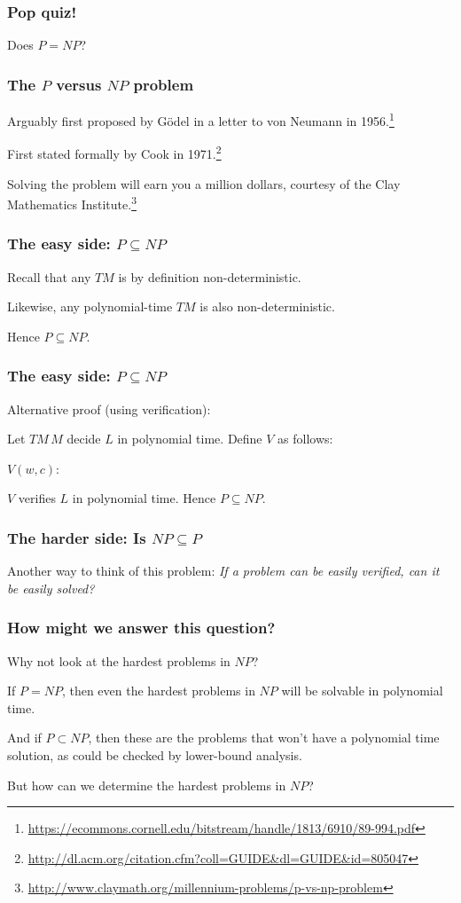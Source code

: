 \documentclass[aspectratio=169]{beamer}
\begin{document}
\begin{frame}
\frametitle{Pop quiz!}
\centerline{Does $P=NP$?}
\end{frame}

\begin{frame}
\frametitle{The $P$ versus $NP$ problem}
Arguably first proposed by G\"{o}del in a letter to von Neumann in 1956.\footnote{\url{https://ecommons.cornell.edu/bitstream/handle/1813/6910/89-994.pdf}}

First stated formally by Cook in 1971.\footnote{\url{http://dl.acm.org/citation.cfm?coll=GUIDE&dl=GUIDE&id=805047}}

Solving the problem will earn you a million dollars, courtesy of the Clay Mathematics Institute.\footnote{\url{http://www.claymath.org/millennium-problems/p-vs-np-problem}}
\end{frame}

\begin{frame}
\frametitle{The easy side: $P \subseteq NP$}

Recall that any $TM$ is by definition non-deterministic.

Likewise, any polynomial-time $TM$ is also non-deterministic.

Hence $P \subseteq NP$.
\end{frame}

\begin{frame}
\frametitle{The easy side: $P \subseteq NP$}

Alternative proof (using verification):

Let $TM\, M$ decide $L$ in polynomial time. Define $V$ as follows:

\begin{algorithm}[H]
$V(w, c):$\\
\end{algorithm}

$V$ verifies $L$ in polynomial time. Hence $P \subseteq NP$.
\end{frame}

\begin{frame}
\frametitle{The harder side: Is $NP \subseteq P$}

Another way to think of this problem: {\em If a problem can be easily verified, can it be easily solved?}
\end{frame}

\begin{frame}
\frametitle{How might we answer this question?}

Why not look at the hardest problems in $NP$?

If $P = NP$, then even the hardest problems in $NP$ will be solvable in polynomial time.

And if $P \subset NP$, then these are the problems that won't have a polynomial time solution, as could be checked by lower-bound analysis.

But how can we determine the hardest problems in $NP$?
\end{frame}
\end{document}
